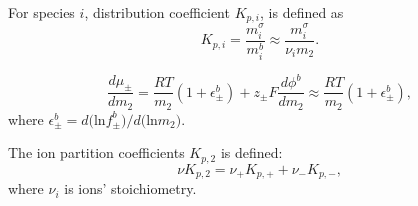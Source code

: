 For species $i$, distribution coefficient $K_{p,i}$, is defined as
\begin{equation}
K_{p,i}= \frac{m_i^{\sigma}}{m_i^b} \approx \frac{m_i^{\sigma}}{\nu_i m_2}.
\label{eq:i}
\end{equation}

\begin{equation}
\frac{d\mu_{\pm}}{dm_2} =\frac{RT}{m_2} (1+\epsilon_{\pm}^b) + z_{\pm}F\frac{d\phi^{b}}{dm_2} \approx \frac{RT}{m_2} (1+\epsilon_{\pm}^b) ,
\label{eq:i1}
\end{equation}
where $\epsilon_{\pm}^b=d($ln$f_{\pm}^b)/d($ln$m_2)$. 

The ion partition coefficients $K_{p,2}$ is defined:
\begin{equation}
\nu K_{p,2}= \nu_+ K_{p,+} + \nu_- K_{p,-},
\label{eq:j}
\end{equation}
where $\nu_i$ is ions' stoichiometry.


